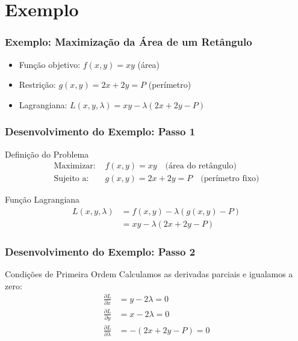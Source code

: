 \documentclass[11pt]{beamer}
\begin{document}
\section{Exemplo}

\begin{frame}
\frametitle{Exemplo: Maximização da Área de um Retângulo}
\begin{itemize}
    \item Função objetivo: $f(x,y) = xy$ (área)
    \item Restrição: $g(x,y) = 2x + 2y = P$ (perímetro)
    \item Lagrangiana: $L(x,y,\lambda) = xy - \lambda(2x + 2y - P)$
\end{itemize}
\end{frame}

\begin{frame}
\frametitle{Desenvolvimento do Exemplo: Passo 1}
\large
\begin{block}{Definição do Problema}
\begin{align*}
\text{Maximizar: } & f(x,y) = xy \quad \text{(área do retângulo)} \\
\text{Sujeito a: } & g(x,y) = 2x + 2y = P \quad \text{(perímetro fixo)}
\end{align*}
\end{block}

\begin{block}{Função Lagrangiana}
\begin{align*}
L(x,y,\lambda) &= f(x,y) - \lambda(g(x,y) - P) \\
&= xy - \lambda(2x + 2y - P)
\end{align*}
\end{block}
\end{frame}

\begin{frame}
\frametitle{Desenvolvimento do Exemplo: Passo 2}
\large
\begin{block}{Condições de Primeira Ordem}
Calculamos as derivadas parciais e igualamos a zero:
\begin{align*}
\frac{\partial L}{\partial x} &= y - 2\lambda = 0 \\
\frac{\partial L}{\partial y} &= x - 2\lambda = 0 \\
\frac{\partial L}{\partial \lambda} &= -(2x + 2y - P) = 0
\end{align*}
\end{block}
\end{frame}
\end{document}
